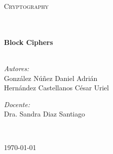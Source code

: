 \documentclass[10pt]{article}
\begin{document}
\begin{center}
\begin{minipage}{0.9\textwidth} 
\begin{center}																					%
\textsc{\LARGE Cryptography}
\end{center}
\end{minipage}\\[0.5cm]
 			\vspace*{1cm}																		%
\HRule \\[0.4cm]																	%
{ \huge \bfseries Block Ciphers}\\[0.4cm]	%
\HRule \\[1.5cm]																	%
\begin{minipage}{0.46\textwidth}													%
\begin{flushleft} \large															%
\emph{Autores:}\\	
González Núñez Daniel Adrián\\
Hernández Castellanos César Uriel\\
\end{flushleft}																		%
\end{minipage}		
\begin{minipage}{0.52\textwidth}		
\vspace{-0.6cm}											%
\begin{flushright} \large															%
\emph{Docente:} \\																	%
Dra. Sandra Diaz Santiago\\													%
\end{flushright}																	%
\end{minipage}	
\vspace*{1cm}
 	
 		\\																		%
\vspace{2cm} 																				
\begin{center}																					
{\large \today}																	%
 			\end{center}												  						
\end{center}							 											
																					
\end{document}
